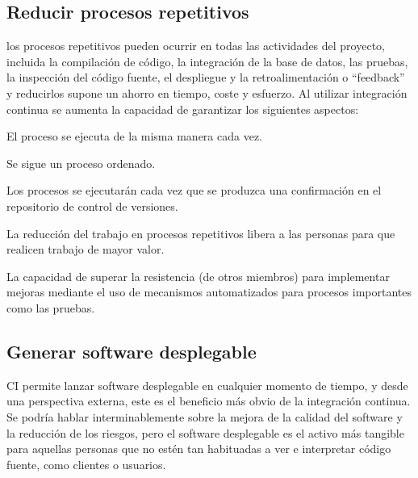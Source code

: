 \subsection{Reducir procesos repetitivos}
los procesos repetitivos pueden ocurrir en todas las actividades del proyecto, incluida la compilación de código, la integración de la base de datos, las pruebas, la inspección del código fuente, el despliegue y la retroalimentación o “feedback” y reducirlos supone un ahorro en tiempo, coste y esfuerzo. Al utilizar integración continua se aumenta la capacidad de garantizar los siguientes aspectos:
\begin{compactitem}
    \item El proceso se ejecuta de la misma manera cada vez.
    \item Se sigue un proceso ordenado.
    \item Los procesos se ejecutarán cada vez que se produzca una confirmación en el repositorio de control de versiones. 
    \item La reducción del trabajo en procesos repetitivos libera a las personas para que realicen trabajo de mayor valor.
    \item La capacidad de superar la resistencia (de otros miembros) para implementar mejoras mediante el uso de mecanismos automatizados para procesos importantes como las pruebas.
\end{compactitem}
\subsection{Generar software desplegable}
CI permite lanzar software desplegable en cualquier momento de tiempo, y desde una perspectiva externa, este es el beneficio más obvio de la integración continua. Se podría hablar interminablemente sobre la mejora de la calidad del software y la reducción de los riesgos, pero el software desplegable es el activo más tangible para aquellas personas que no estén tan habituadas a ver e interpretar código fuente, como clientes o usuarios.
